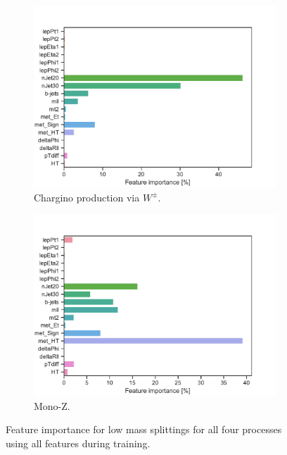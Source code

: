 \begin{figure}[H]
    \begin{subfigure}[t!]{0.49\textwidth}
        \includegraphics[width = \textwidth]{Figures/WW/BDT/All_level/Low/featureImportance.pdf}
        \caption{Chargino production via $W^\pm$.}
        \label{fig:featWWLow}
    \end{subfigure}
    \begin{subfigure}[t!]{0.49\textwidth}
        \includegraphics[width = \textwidth]{Figures/Mono_Z/ML/BDT/All_level/Low/featureImportance.pdf}
        \caption{Mono-Z.}
        \label{fig:featMonoZLow}
    \end{subfigure}
    \caption{Feature importance for low mass splittings for all four processes using all features during training.}
    \label{fig:AllLowfeatBDT}
\end{figure}

